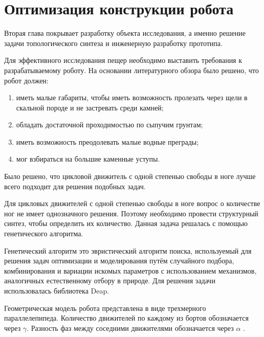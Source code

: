 
\chapter{Оптимизация конструкции робота}\label{ch:ch2}

Вторая глава покрывает разработку объекта исследования, а именно решение задачи топологического синтеза и инженерную разработку прототипа.

Для эффективного исследования пещер необходимо выставить требования к разрабатываемому роботу. На основании литературного обзора было решено, что робот должен:
\begin{enumerate}
    \item иметь малые габариты, чтобы иметь возможность пролезать через щели в скальной породе и не застревать среди камней;
    \item обладать достаточной проходимостью по сыпучим грунтам;
    \item иметь возможность преодолевать малые водные преграды;
    \item мог взбираться на большие каменные уступы.
\end{enumerate}

Было решено, что цикловой движитель с одной степенью свободы в ноге лучше всего подходит для решения подобных задач.

Для цикловых движителей с одной степенью свободы в ноге вопрос о количестве ног не имеет однозначного решения. Поэтому необходимо провести структурный синтез, чтобы определить их количество. Данная задача решалась с помощью генетического алгоритма.

Генетический алгоритм это эвристический алгоритм поиска, используемый для решения задач оптимизации и моделирования путём случайного подбора, комбинирования и вариации искомых параметров с использованием механизмов, аналогичных естественному отбору в природе. Для решения задачи использовалась библиотека Deap.

Геометрическая модель робота представлена в виде трехмерного параллелепипеда. Количество движителей по каждому из бортов обозначается через $\gamma$. Разность фаз между соседними движителями обозначается через  $\alpha$ .

